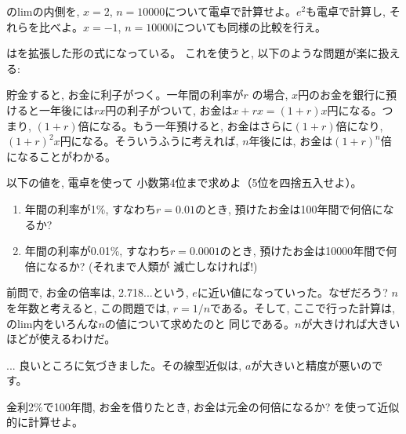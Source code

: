 \begin{q}\label{q:func_e_def} のlimの内側を, 
$x=2$, $n=10000$について電卓で計算せよ。$e^2$も電卓で計算し, 
それらを比べよ。$x=-1$, $n=10000$についても同様の比較を行え。\end{q}

はを拡張した形の式になっている。
これを使うと, 以下のような問題が楽に扱える:\hv

\begin{exmpl} 貯金すると, お金に利子がつく。一年間の利率が$r$
の場合, $x$円のお金を銀行に預けると一年後には$rx$円の利子がついて, 
お金は$x+rx=(1+r)x$円になる。つまり, $(1+r)$倍になる。もう一年預けると, 
お金はさらに$(1+r)$倍になり, $(1+r)^2x$円になる。そういうふうに考えれば, 
$n$年後には, お金は$(1+r)^n$倍になることがわかる。\end{exmpl}

\begin{q}\label{q:func_exp_interest1} 以下の値を, 電卓を使って
小数第4位まで求めよ（5位を四捨五入せよ）。
\begin{enumerate}
\item 年間の利率が1\%, すなわち$r=0.01$のとき, 
預けたお金は100年間で何倍になるか?
\item 年間の利率が0.01\%, すなわち$r=0.0001$のとき, 
預けたお金は10000年間で何倍になるか? (それまで人類が
滅亡しなければ!)
\end{enumerate}
\end{q}

前問で, お金の倍率は, 2.718...という, $e$に近い値になっていった。なぜだろう?
$n$を年数と考えると, この問題では, $r=1/n$である。そして, ここで行った計算は, 
のlim内をいろんな$n$の値について求めたのと
同じである。$n$が大きければ大きいほどが使えるわけだ。

\begin{faq}{\small{}
... 良いところに気づきました。その線型近似は, $a$が大きいと精度が悪いのです。}\end{faq}

\begin{q}\label{q:func_exp_interest3} 金利2\%で100年間, お金を借りたとき, 
お金は元金の何倍になるか? を使って近似的に計算せよ。
\end{q}

